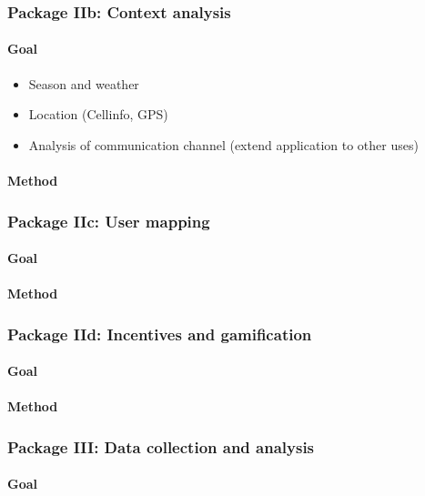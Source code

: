\documentclass[11pt]{article}
\begin{document}
\subsubsection*{Package IIb: Context analysis}
\paragraph{Goal}
\begin{itemize}
 \item Season and weather
 \item Location (Cellinfo, GPS)
 \item Analysis of communication channel (extend application to other uses)
 
\end{itemize}

\paragraph{Method}

\subsubsection*{Package IIc: User mapping}
\paragraph{Goal}
\paragraph{Method}

\subsubsection*{Package IId: Incentives and gamification}
\paragraph{Goal}
\paragraph{Method}

\subsubsection*{Package III: Data collection and analysis}
\paragraph{Goal}
\end{document}
